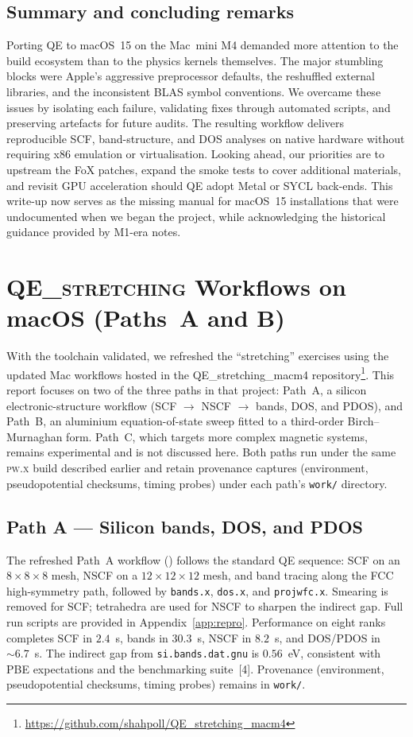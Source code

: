 \documentclass[12pt]{article}
\begin{document}
\subsection{Summary and concluding remarks}
Porting QE to macOS~15 on the Mac~mini M4 demanded more attention to the build ecosystem than to the physics kernels themselves. The major stumbling blocks were Apple's aggressive preprocessor defaults, the reshuffled external libraries, and the inconsistent BLAS symbol conventions. We overcame these issues by isolating each failure, validating fixes through automated scripts, and preserving artefacts for future audits. The resulting workflow delivers reproducible SCF, band-structure, and DOS analyses on native hardware without requiring x86 emulation or virtualisation. Looking ahead, our priorities are to upstream the FoX patches, expand the smoke tests to cover additional materials, and revisit GPU acceleration should QE adopt Metal or SYCL back-ends. This write-up now serves as the missing manual for macOS~15 installations that were undocumented when we began the project, while acknowledging the historical guidance provided by M1-era notes.

\section{\textsc{QE\_stretching} Workflows on macOS (Paths~A and B)}
\label{sec:qe-basics}
With the toolchain validated, we refreshed the ``stretching'' exercises using the updated Mac workflows hosted in the QE\_stretching\_macm4 repository\footnote{\url{https://github.com/shahpoll/QE_stretching_macm4}}. This report focuses on two of the three paths in that project: Path~A, a silicon electronic-structure workflow (SCF $\rightarrow$ NSCF $\rightarrow$ bands, DOS, and PDOS), and Path~B, an aluminium equation-of-state sweep fitted to a third-order Birch--Murnaghan form. Path~C, which targets more complex magnetic systems, remains experimental and is not discussed here. Both paths run under the same \textsc{pw.x} build described earlier and retain provenance captures (environment, pseudopotential checksums, timing probes) under each path's \texttt{work/} directory.

\subsection{Path A — Silicon bands, DOS, and PDOS}
The refreshed Path~A workflow () follows the standard QE sequence: SCF on an $8\times8\times8$ mesh, NSCF on a $12\times12\times12$ mesh, and band tracing along the FCC high-symmetry path, followed by \texttt{bands.x}, \texttt{dos.x}, and \texttt{projwfc.x}. Smearing is removed for SCF; tetrahedra are used for NSCF to sharpen the indirect gap. Full run scripts are provided in Appendix~\ref{app:repro}. Performance on eight ranks completes SCF in $2.4$~s, bands in $30.3$~s, NSCF in $8.2$~s, and DOS/PDOS in $\sim6.7$~s. The indirect gap from \texttt{si.bands.dat.gnu} is $0.56$~eV, consistent with PBE expectations and the benchmarking suite~[4]. Provenance (environment, pseudopotential checksums, timing probes) remains in \texttt{work/}.
\end{document}
